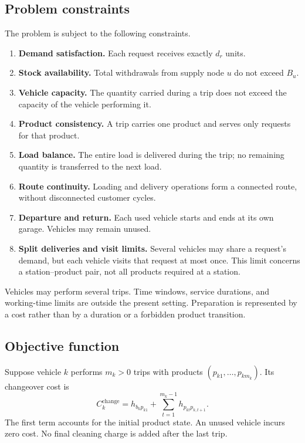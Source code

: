 \subsection{Problem constraints}
The problem is subject to the following constraints.
\begin{enumerate}
\renewcommand{\labelenumi}{\alph{enumi}.}
\item \textbf{Demand satisfaction.} Each request receives exactly $d_r$ units.
\item \textbf{Stock availability.} Total withdrawals from supply node $u$ do
not exceed $B_u$.
\item \textbf{Vehicle capacity.} The quantity carried during a trip does not
exceed the capacity of the vehicle performing it.
\item \textbf{Product consistency.} A trip carries one product and serves
only requests for that product.
\item \textbf{Load balance.} The entire load is delivered during the trip;
no remaining quantity is transferred to the next load.
\item \textbf{Route continuity.} Loading and delivery operations form a
connected route, without disconnected customer cycles.
\item \textbf{Departure and return.} Each used vehicle starts and ends at its
own garage. Vehicles may remain unused.
\item \textbf{Split deliveries and visit limits.} Several vehicles may share
a request's demand, but each vehicle visits that request at most once. This
limit concerns a station--product pair, not all products required at a station.
\end{enumerate}

Vehicles may perform several trips. Time windows, service durations, and
working-time limits are outside the present setting. Preparation is represented
by a cost rather than by a duration or a forbidden product transition.

\subsection{Objective function}
Suppose vehicle $k$ performs $m_k>0$ trips with products
$(p_{k1},\ldots,p_{km_k})$. Its changeover cost is
\[
C_k^{\mathrm{change}}=h_{b_kp_{k1}}+
\sum_{t=1}^{m_k-1}h_{p_{kt}p_{k,t+1}}.
\]
The first term accounts for the initial product state. An unused vehicle
incurs zero cost. No final cleaning charge is added after the last trip.

